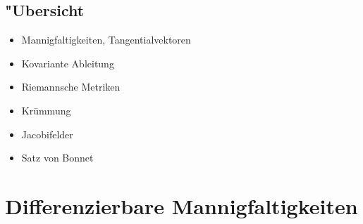 
\section*{"Ubersicht}

\begin{itemize}
\item Mannigfaltigkeiten, Tangentialvektoren
\item Kovariante Ableitung
\item Riemannsche Metriken
\item Krümmung
\item Jacobifelder
\item Satz von Bonnet
\end{itemize}

\chapter{Differenzierbare Mannigfaltigkeiten}

